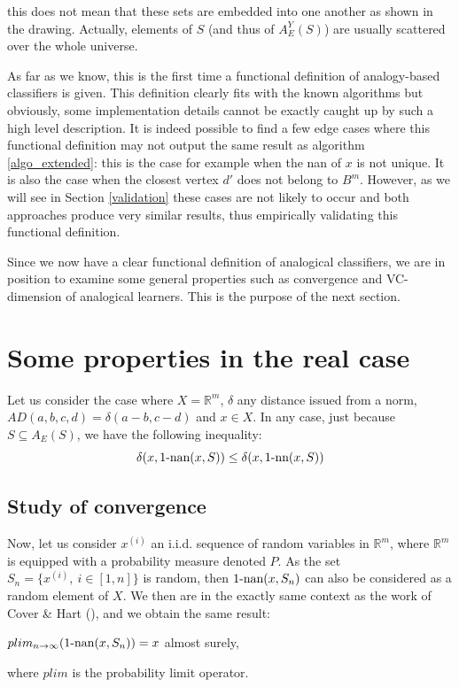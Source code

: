 this does not mean that these sets are embedded into one another as shown in
the drawing. Actually, elements of $S$ (and thus of $A_E^Y(S)$) are usually
scattered over the whole universe.

As far as we know, this is the first time a functional definition of
analogy-based classifiers is given. This definition clearly fits with the known
algorithms but obviously, some implementation details cannot be exactly caught
up by such a high level description. It is indeed possible to find a few edge
cases where this functional definition may not output the same result as
algorithm \ref{algo_extended}: this is the case for example when the nan of $x$
is not unique. It is
also the case when the closest vertex $d'$ does not belong to $B^m$.  However,
as we will see in Section \ref{validation} these cases are not likely to occur
and both approaches produce very similar results, thus empirically validating
this functional definition.

Since we now have a clear functional definition of analogical classifiers, we
are in position to examine some general properties such as convergence and
VC-dimension of analogical learners. This is the purpose of the next section.

\section{Some properties in the real case}\label{convergence}
Let us consider the case where $X=\mathbb{R}^m$, $\delta$ any distance issued
from a norm, $AD(a,b,c,d)=\delta(a-b,c-d)$ and $x \in X$.  In any case, just
because $S \subseteq A_E(S)$, we have the following inequality:
$$\delta(x, 1\mbox{-nan}(x,S)) \leq \delta(x, 1\mbox{-nn}(x,S))$$

\subsection{Study of convergence}

Now, let us consider  $x^{(i)}$ an i.i.d. sequence of random variables in
$\mathbb{R}^m$, where $\mathbb{R}^m$ is equipped with a probability measure
denoted $P$. As the set $S_n=\{x^{(i)}, ~ i \in [1, n]\}$ is random, then
$1\mbox{-nan}(x,S_n)$ can also be considered as a random element of $X$.  We then are
in the exactly same context as the work of Cover \& Hart (\cite{CovHarTIT67}), and
we obtain the same result:
\begin{property}\label{propconvergence}
$plim_{n \to \infty}(1\mbox{-nan}(x,S_n))=x$ almost surely,
\end{property}
where $plim$ is the probability limit operator.

